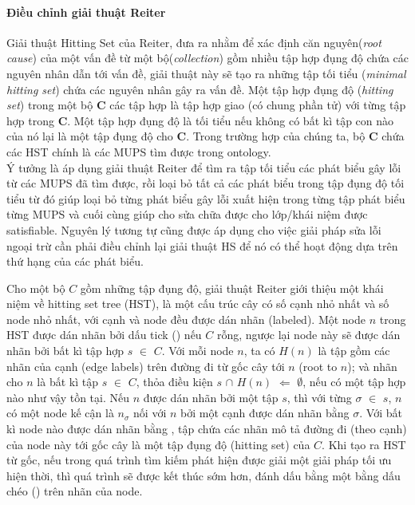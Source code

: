 	\paragraph{Điều chỉnh giải thuật Reiter} Giải thuật Hitting Set của Reiter\cite{hst}, đưa ra nhằm để xác định căn nguyên(\textit{root cause}) của một vấn đề từ một bộ(\textit{collection}) gồm nhiều tập hợp đụng độ chứa các nguyên nhân dẫn tới vấn đề, giải thuật này sẽ tạo ra những tập tối tiểu (\textit{minimal hitting set}) chứa các nguyên nhân gây ra vấn đề. Một tập hợp đụng độ (\textit{hitting set}) trong một bộ \textbf{C} các tập hợp là tập hợp giao (có chung phần tử) với từng tập hợp trong \textbf{C}. Một tập hợp đụng độ là tối tiểu nếu không có bất kì tập con nào của nó lại là một tập đụng độ cho \textbf{C}. Trong trường hợp của chúng ta, bộ \textbf{C} chứa các HST chính là các MUPS tìm được trong ontology.  \\\hspace*{.05\textwidth} Ý tưởng là áp dụng giải thuật Reiter để tìm ra tập tối tiểu các phát biểu gây lỗi từ các MUPS đã tìm được, rồi loại bỏ tất cả các phát biểu trong tập đụng độ tối tiểu từ đó giúp loại bỏ từng phát biểu gây lỗi xuất hiện trong từng tập phát biểu từng MUPS và cuối cùng giúp cho sửa chữa được cho lớp/khái niệm được satisfiable. Nguyên lý tương tự cũng được áp dụng cho việc giải pháp sửa lỗi ngoại trừ cần phải điều chỉnh lại giải thuật HS để nó có thể hoạt động dựa trên thứ hạng của các phát biểu.
	
	\hspace*{.05\textwidth} Cho một bộ $C$ gồm những tập đụng độ, giải thuật Reiter giới thiệu một khái niệm về hitting set tree (HST), là một cấu trúc cây có số cạnh nhỏ nhất và số node nhỏ nhất, với cạnh và node đều được dán nhãn (labeled). Một node $n$ trong HST được dán nhãn bởi dấu tick (\cmark) nếu $C$ rỗng, ngược lại node này sẽ được dán nhãn bởi bất kì tập hợp $s$ $\in$ $C$. Với mỗi node $n$, ta có $H(n)$ là tập gồm các nhãn của cạnh (edge labels) trên đường đi từ gốc cây tới $n$ (root to $n$); và nhãn cho $n$ là bất kì tập $s$ $\in$ $C$, thỏa điều kiện $s$ $\cap$ $H(n)$ $\Leftarrow$ $\emptyset$, nếu có một tập hợp nào như vậy tồn tại. Nếu $n$ được dán nhãn bởi một tập $s$, thì với từng $\sigma$ $\in$ $s$, $n$ có một node kế cận là $n_{\sigma}$ nối với $n$ bởi một cạnh được dán nhãn bằng $\sigma$. Với bất kì node nào được dán nhãn bằng \cmark , tập chứa các nhãn mô tả đường đi (theo cạnh) của node này tới gốc cây là một tập đụng độ (hitting set) của $C$. Khi tạo ra HST từ gốc, nếu trong quá trình tìm kiếm phát hiện được giải một giải pháp tối ưu hiện thời, thì quá trình sẽ được kết thúc sớm hơn, đánh dấu bằng một bằng dấu chéo (\xmark) trên nhãn của node.
	
